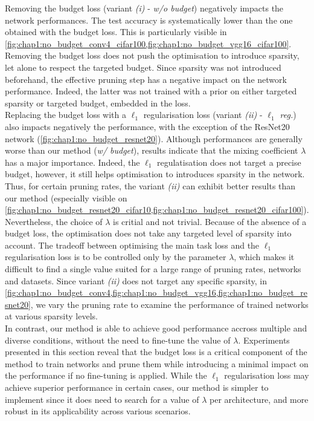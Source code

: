 Removing the budget loss (variant \emph{(i)} - \emph{w/o budget}) negatively
impacts the network performances. The test accuracy is systematically lower than
the one obtained with the budget loss. This is particularly visible in
\cref{fig:chap1:no_budget_conv4_cifar100,fig:chap1:no_budget_vgg16_cifar100}.
Removing the budget loss does not push the optimisation to introduce sparsity,
let alone to respect the targeted budget. Since sparsity was not introduced
beforehand, the effective pruning step has a negative impact on the network
performance. Indeed, the latter was not trained with a prior on either targeted
sparsity or targeted budget, embedded in the loss.\\


Replacing the budget loss with a $\ell_1$ regularisation loss (variant \emph{(ii)}
- \emph{$\ell_1$ reg.}) also impacts negatively the performance, with the exception
of the ResNet20 network (\cref{fig:chap1:no_budget_resnet20}). Although
performances are generally worse than our method (\emph{w/ budget}), results
indicate that the mixing coefficient $\lambda$ has a major importance. Indeed,
the $\ell_1$ regulatisation does not target a precise budget, however, it still
helps optimisation to introduces sparsity in the network. Thus, for certain
pruning rates, the variant \emph{(ii)} can exhibit better results than our
method (especially visible on
\cref{fig:chap1:no_budget_resnet20_cifar10,fig:chap1:no_budget_resnet20_cifar100}).
Nevertheless, the choice of $\lambda$ is critial and not trivial. Because of the
absence of a budget loss, the optimisation does not take any targeted level of
sparsity into account. The tradeoff between optimising the main task loss and
the $\ell_1$ regularisation loss is to be controlled only by the parameter
$\lambda$, which makes it difficult to find a single value suited for a large
range of pruning rates, networks and datasets. Since variant \emph{(ii)} does
not target any specific sparsity, in
\cref{fig:chap1:no_budget_conv4,fig:chap1:no_budget_vgg16,fig:chap1:no_budget_resnet20},
we vary the pruning rate to examine the performance of trained networks at
various sparsity levels.\\

In contrast, our method is able to achieve good performance accross multiple and
diverse conditions, without the need to fine-tune the value of $\lambda$.
Experiments presented in this section reveal that the budget loss is a critical
component of the method to train networks and prune them while introducing a
minimal impact on the performance if no fine-tuning is applied. While the
$\ell_1$ regularisation loss may achieve superior performance in certain cases,
our method is simpler to implement since it does need to search for a value of
$\lambda$ per architecture, and more robust in its applicability across various
scenarios.\\

